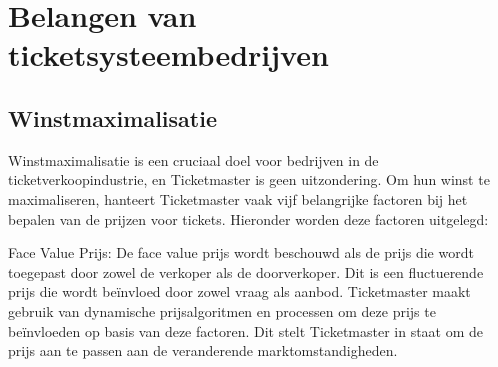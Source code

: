 
\section{Belangen van ticketsysteembedrijven}



\subsection{Winstmaximalisatie}
Winstmaximalisatie is een cruciaal doel voor bedrijven in de ticketverkoopindustrie, en Ticketmaster is geen uitzondering. Om hun winst te maximaliseren, hanteert Ticketmaster vaak vijf belangrijke factoren bij het bepalen van de prijzen voor tickets. Hieronder worden deze factoren uitgelegd:

\vspace{5 mm}

Face Value Prijs: De face value prijs wordt beschouwd als de prijs die wordt toegepast door zowel de verkoper als de doorverkoper. Dit is een fluctuerende prijs die wordt beïnvloed door zowel vraag als aanbod. Ticketmaster maakt gebruik van dynamische prijsalgoritmen en processen om deze prijs te beïnvloeden op basis van deze factoren. Dit stelt Ticketmaster in staat om de prijs aan te passen aan de veranderende marktomstandigheden.


